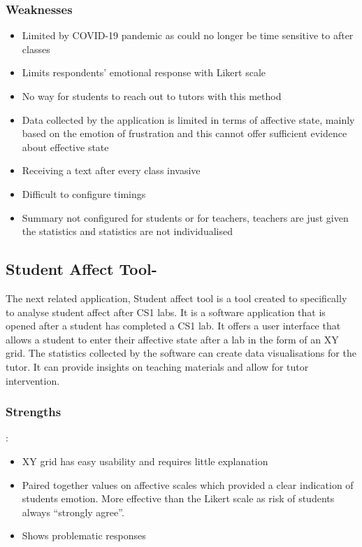 \documentclass{l4proj}
\begin{document}
\subsubsection{Weaknesses}
\begin{itemize}
    \item Limited by COVID-19 pandemic as could no longer be time sensitive to after classes
    \item Limits respondents’ emotional response with Likert scale
    \item No way for students to reach out to tutors with this method
    \item Data collected by the application is limited in terms of affective state, mainly based on the emotion of frustration and this cannot offer sufficient evidence about effective state
    \item Receiving a text after every class invasive
    \item Difficult to configure timings
    \item Summary not configured for students or for teachers, teachers are just given the statistics and statistics are not individualised
\end{itemize}

\label{SAT}\subsection{Student Affect Tool- \cite{haden_student_2017}}
The next related application, Student affect tool is a tool created to specifically to analyse student affect after CS1 labs. It is a software application that is opened after a student has completed a CS1 lab. It offers a user interface that allows a student to enter their affective state after a lab in the form of an XY grid. The statistics collected by the software can create data visualisations for the tutor. It can provide insights on teaching materials and allow for tutor intervention.
\subsubsection{Strengths}:
\begin{itemize}
\item XY grid has easy usability and requires little explanation
\item Paired together values on affective scales which provided a clear indication of students emotion. More effective than the Likert scale as risk of students always “strongly agree”.
\item Shows problematic responses
\end{itemize}
\end{document}
